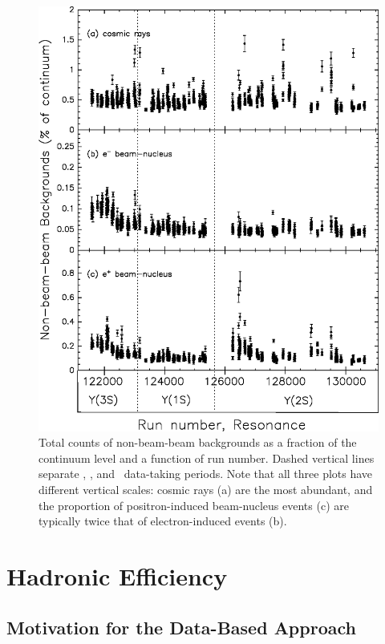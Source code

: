 \documentclass{cornell}
\begin{document}
\begin{figure}[p]
  \begin{center}
    \includegraphics[width=0.85\linewidth]{backgroundsvsrun}
  \end{center}
  \caption[Fraction of non-beam-beam backgrounds in every
  run]{\label{backgroundsvsrun} Total counts of non-beam-beam
  backgrounds as a fraction of the continuum level and a function of
  run number.  Dashed vertical lines separate \usss, \us, and \uss\
  data-taking periods.  Note that all three plots have different
  vertical scales: cosmic rays (a) are the most abundant, and the
  proportion of positron-induced beam-nucleus events (c) are typically
  twice that of electron-induced events (b).}
\end{figure}

\chapter{Hadronic Efficiency}
\label{chp:efficiency}

\section{Motivation for the Data-Based Approach}
\end{document}
